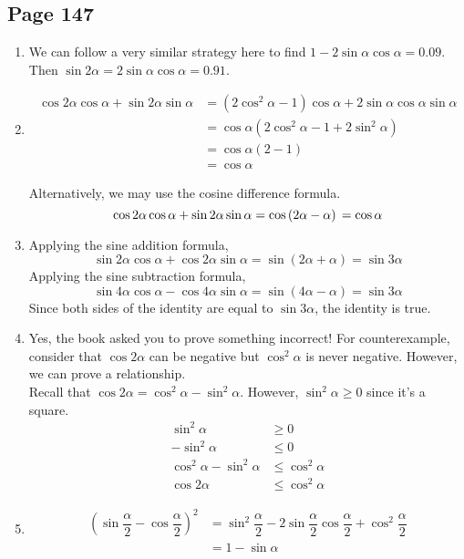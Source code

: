 \documentclass{article}
\newenvironment{solutions}[1]
{\subsection*{#1}
 \begin{enumerate}[leftmargin=1.5em]}
{\end{enumerate}}
\newcommand{\solution}{\item}
\begin{document}
\begin{solutions}{Page 147}
\solution %
We can follow a very similar strategy here to find $1-2\sin{\alpha}\cos{\alpha}=0.09$. Then $\sin {2\alpha}=2\sin{\alpha}\cos\alpha=0.91$.

\solution %
\begin{align*}
\cos{2\alpha}\cos{\alpha} + \sin{2\alpha}\sin{\alpha} &= \left(2\cos^{2}{\alpha}-1\right)\cos{\alpha} + 2\sin{\alpha}\cos{\alpha}\sin{\alpha} \\
&= \cos{\alpha} \left(2\cos^{2}{\alpha - 1 + 2\sin^{2}{\alpha}}\right) \\
&= \cos{\alpha} \left(2-1\right) \\
&= \cos{\alpha}
\end{align*}

Alternatively, we may use the cosine difference formula.
\[
\cos{2\alpha}\cos{\alpha} + \sin{2\alpha}\sin{\alpha} = \cos\left(2\alpha-\alpha\right) \\
= \cos{\alpha}
\]

\solution %
Applying the sine addition formula,
\[
\sin{2\alpha}\cos{\alpha} + \cos{2\alpha}\sin{\alpha} = \sin\left(2\alpha+\alpha\right) = \sin{3\alpha}
\]
Applying the sine subtraction formula,
\[
\sin{4\alpha}\cos{\alpha} - \cos{4\alpha}\sin{\alpha} = \sin\left(4\alpha-\alpha\right) = \sin{3\alpha}
\]
Since both sides of the identity are equal to $\sin{3\alpha}$, the identity is true.

\solution %
Yes, the book asked you to prove something incorrect! For counterexample, consider that $\cos {2\alpha}$ can be negative but $\cos^{2}{\alpha}$ is never negative. However, we can prove a relationship.\\
Recall that $\cos{2\alpha}=\cos^{2}{\alpha} - \sin^{2}{\alpha}$. However, $\sin^{2}{\alpha} \geq 0$ since it's a square.
\begin{align*}
    \sin^2\alpha&\geq 0\\
    -\sin^2\alpha&\leq 0\\
    \cos^2\alpha-\sin^2\alpha&\leq \cos^2\alpha\\
    \cos 2\alpha &\leq \cos^2\alpha
\end{align*}

\solution %
\begin{align*}
\left(\sin{\dfrac{\alpha}{2}} - \cos{\dfrac{\alpha}{2}}\right)^2 &= \sin^{2}{\dfrac{\alpha}{2}} - 2 \sin{\dfrac{\alpha}{2}}\cos{\dfrac{\alpha}{2}} + \cos^{2}{\dfrac{\alpha}{2}} \\
&= 1 - \sin{\alpha}
\end{align*}


\end{solutions}
\end{document}
